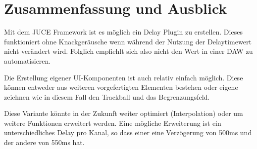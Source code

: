 \chapter{Zusammenfassung und Ausblick}

Mit dem JUCE Framework ist es möglich ein Delay Plugin zu erstellen. Dieses funktioniert ohne Knackgeräusche wenn während der Nutzung der Delaytimewert nicht verändert wird. Folglich empfiehlt sich also nicht den Wert in einer DAW zu automatisieren. 

Die Erstellung eigener UI-Komponenten ist auch relativ einfach möglich. Diese können entweder aus weiteren vorgefertigten Elementen bestehen oder eigene zeichnen wie in diesem Fall den Trackball und das Begrenzungsfeld.

Diese Variante könnte in der Zukunft weiter optimiert (Interpolation) oder um weitere Funktionen erweitert werden. Eine mögliche Erweiterung ist ein unterschiedliches Delay pro Kanal, so dass einer eine Verzögerung von 500ms und der andere von 550ms hat.